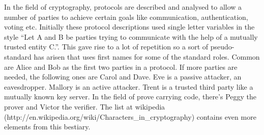 \documentclass[12pt]{article}
\begin{document}
In the field of cryptography, protocols are described and analysed to allow a number of parties to achieve certain goals like communication, authentication, voting etc. Initially these protocol descriptions used single letter variables in the style ``Let A and B be parties trying to communicate with the help of a mutually trusted entity C.''. This gave rise to a lot of repetition so a sort of pseudo-standard has arisen that uses first names for some of the standard roles.
Common are Alice and Bob as the first two parties in a protocol. If more parties are needed, the following ones are Carol and Dave. Eve is a passive attacker, an eavesdropper. Mallory is an active attacker. Trent is a trusted third party like a  mutually known key server. In the field of prove carrying code, there's Peggy the prover and Victor the verifier. The list at wikipedia (http://en.wikipedia.org/wiki/Characters\_in\_cryptography) contains even more elements from this bestiary.
\end{document}
